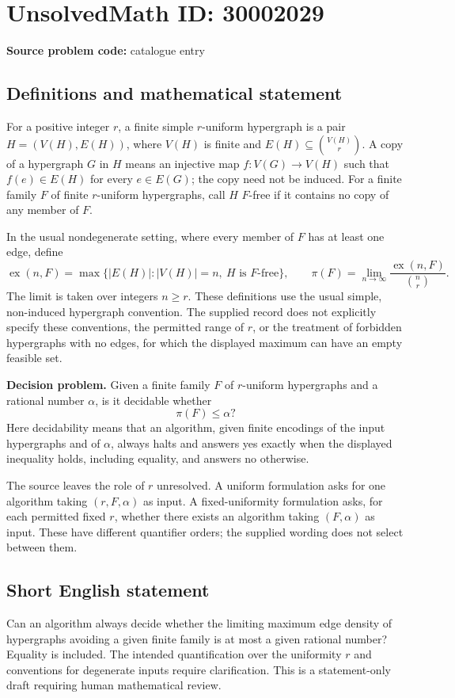 \documentclass[11pt]{article}
\begin{document}
\section*{UnsolvedMath ID: 30002029}
\textbf{Source problem code:} catalogue entry
\subsection{Definitions and mathematical statement}
For a positive integer \(r\), a finite simple \(r\)-uniform hypergraph is a pair \(H=(V(H),E(H))\), where \(V(H)\) is finite and \(E(H)\subseteq\binom{V(H)}{r}\). A copy of a hypergraph \(G\) in \(H\) means an injective map \(f:V(G)\to V(H)\) such that \(f(e)\in E(H)\) for every \(e\in E(G)\); the copy need not be induced. For a finite family \(F\) of finite \(r\)-uniform hypergraphs, call \(H\) \(F\)-free if it contains no copy of any member of \(F\).

In the usual nondegenerate setting, where every member of \(F\) has at least one edge, define
\[
\operatorname{ex}(n,F)=\max\bigl\{|E(H)|:|V(H)|=n,\ H\text{ is }F\text{-free}\bigr\},
\qquad
\pi(F)=\lim_{n\to\infty}\frac{\operatorname{ex}(n,F)}{\binom{n}{r}}.
\]
The limit is taken over integers \(n\ge r\). These definitions use the usual simple, non-induced hypergraph convention. The supplied record does not explicitly specify these conventions, the permitted range of \(r\), or the treatment of forbidden hypergraphs with no edges, for which the displayed maximum can have an empty feasible set.

\textbf{Decision problem.} Given a finite family \(F\) of \(r\)-uniform hypergraphs and a rational number \(\alpha\), is it decidable whether
\[
\pi(F)\leq\alpha?
\]
Here decidability means that an algorithm, given finite encodings of the input hypergraphs and of \(\alpha\), always halts and answers yes exactly when the displayed inequality holds, including equality, and answers no otherwise.

The source leaves the role of \(r\) unresolved. A uniform formulation asks for one algorithm taking \((r,F,\alpha)\) as input. A fixed-uniformity formulation asks, for each permitted fixed \(r\), whether there exists an algorithm taking \((F,\alpha)\) as input. These have different quantifier orders; the supplied wording does not select between them.
\subsection{Short English statement}
Can an algorithm always decide whether the limiting maximum edge density of hypergraphs avoiding a given finite family is at most a given rational number? Equality is included. The intended quantification over the uniformity \(r\) and conventions for degenerate inputs require clarification. This is a statement-only draft requiring human mathematical review.
\end{document}
